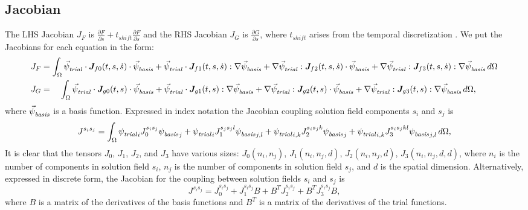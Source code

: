 \subsection{Jacobian}

The LHS Jacobian $J_F$ is $\frac{\partial F}{\partial s} +
t_\mathit{shift} \frac{\partial F}{\partial \dot{s}}$ and the RHS
Jacobian $J_G$ is $\frac{\partial G}{\partial s}$, where
$t_\mathit{shift}$ arises from the temporal discretization . We put
the Jacobians for each equation in the form:
\begin{align}
  \label{eqn:jacobian:form}
  J_F &= \int_\Omega \trialvec \cdot \tensor{J}_{f0}(t,s,\dot{s}) \cdot \basisvec
  + \trialvec \cdot \tensor{J}_{f1}(t,s,\dot{s}) : \nabla \basisvec
  + \nabla \trialvec : \tensor{J}_{f2}(t,s,\dot{s}) \cdot \basisvec
  + \nabla \trialvec : \tensor{J}_{f3}(t,s,\dot{s}) : \nabla \basisvec \, d\Omega \\
%
  J_G &= \quad \int_\Omega \trialvec \cdot \tensor{J}_{g0}(t,s) \cdot \basisvec
  + \trialvec \cdot \tensor{J}_{g1}(t,s) : \nabla \basisvec
  + \nabla \trialvec : \tensor{J}_{g2}(t,s) \cdot \basisvec
  + \nabla \trialvec : \tensor{J}_{g3}(t,s) : \nabla \basisvec \, d\Omega,
\end{align}
where ${\vec{\psi}_\mathit{basis}^{}}$ is a basis function.  Expressed in index notation
the Jacobian coupling solution field components $s_i$ and $s_j$ is
\begin{equation}
\label{eqn:jacobian:index:form}
J^{s_is_j} = \int_\Omega {\psi_\mathit{trial}^{}}_i J_0^{s_is_j} {\psi_\mathit{basis}^{}}_j + {\psi_\mathit{trial}^{}}_i 
J_1^{s_js_jl} 
{\psi_\mathit{basis}^{}}_{j,l} + {\psi_\mathit{trial}^{}}_{i,k} J_2^{s_is_jk} {\psi_\mathit{basis}^{}}_j + {\psi_\mathit{trial}^{}}_{i,k} 
J_3^{s_is_jkl} 
{\psi_\mathit{basis}^{}}_{j,l} \, d\Omega, 
\end{equation}
It is clear that the tensors $J_0$, $J_1$, $J_2$, and $J_3$ have
various sizes: $J_0(n_i,n_j)$, $J_1(n_i,n_j,d)$, $J_2(n_i,n_j,d)$,
$J_3(n_i,n_j,d,d)$, where $n_i$ is the number of components in
solution field $s_i$, $n_j$ is the number of components in solution
field $s_j$, and $d$ is the spatial dimension.  Alternatively,
expressed in discrete form, the Jacobian for the coupling between
solution fields $s_i$ and $s_j$ is
\begin{equation}
  \label{eqn:jacobian:discrete:form}
  J^{s_is_j} = J_{0}^{s_is_j} + J_{1}^{s_is_j} B + B^T J_{2}^{s_is_j} + B^T J_{3}^{s_is_j} B,
\end{equation}
where $B$ is a matrix of the derivatives of the basis functions and $B^T$
is a matrix of the derivatives of the trial functions. 

